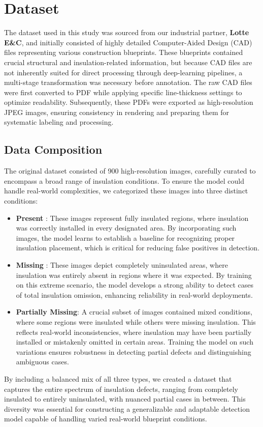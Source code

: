 \documentclass[]{IEEEphot}
\begin{document}
\section{Dataset}
\hspace*{1em} The dataset used in this study was sourced from our industrial partner, \textbf{Lotte E\&C}, and initially consisted of highly detailed Computer-Aided Design (CAD) files representing various construction blueprints. These blueprints contained crucial structural and insulation-related information, but because CAD files are not inherently suited for direct processing through deep-learning pipelines, a multi-stage transformation was necessary before annotation. The raw CAD files were first converted to PDF while applying specific line-thickness settings to optimize readability. Subsequently, these PDFs were exported as high-resolution JPEG images, ensuring consistency in rendering and preparing them for systematic labeling and processing.
\subsection{Data Composition}
The original dataset consisted of 900 high-resolution images, carefully curated to encompass a broad range of insulation conditions. To ensure the model could handle real-world complexities, we categorized these images into three distinct conditions:
 
\begin{itemize}
\item \textbf{Present} : These images represent fully insulated regions, where insulation was correctly installed in every designated area. By incorporating such images, the model learns to establish a baseline for recognizing proper insulation placement, which is critical for reducing false positives in detection.\\
\item \textbf{Missing} : These images depict completely uninsulated areas, where insulation was entirely absent in regions where it was expected. By training on this extreme scenario, the model develops a strong ability to detect cases of total insulation omission, enhancing reliability in real-world deployments.\\
\item \textbf{Partially Missing}: A crucial subset of images contained mixed conditions, where some regions were insulated while others were missing insulation. This reflects real-world inconsistencies, where insulation may have been partially installed or mistakenly omitted in certain areas. Training the model on such variations ensures robustness in detecting partial defects and distinguishing ambiguous cases.
\end{itemize}
By including a balanced mix of all three types, we created a dataset that captures the entire spectrum of insulation defects, ranging from completely insulated to entirely uninsulated, with nuanced partial cases in between. This diversity was essential for constructing a generalizable and adaptable detection model capable of handling varied real-world blueprint conditions.
\end{document}
